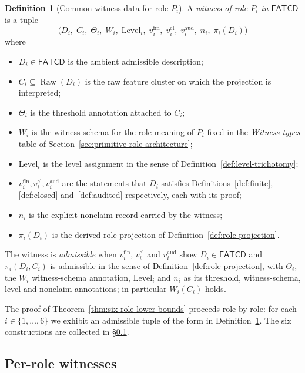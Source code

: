 \documentclass[11pt]{article}
\theoremstyle{definition}
\newtheorem{definition}[theorem]{Definition}
\newcommand{\FATCD}{\ensuremath{\mathsf{FATCD}}}
\newcommand{\Raw}[1]{\ensuremath{\operatorname{Raw}\!\left(#1\right)}}
\begin{document}
\begin{definition}[Common witness data for role \(P_i\)]\label{def:common-witness-data}
A \emph{witness of role \(P_i\) in \FATCD{}} is a tuple
\[
\bigl(D_i,\; C_i,\; \Theta_i,\; W_i,\; \mathrm{Level}_i,\;
v_i^{\mathrm{fin}},\; v_i^{\mathrm{cl}},\; v_i^{\mathrm{aud}},\;
n_i,\; \pi_i(D_i)\bigr)
\]
where
\begin{itemize}[topsep=2pt,itemsep=1pt]
  \item \(D_i \in \FATCD{}\) is the ambient admissible description;
  \item \(C_i \subseteq \Raw{D_i}\) is the raw feature cluster on which
    the projection is interpreted;
  \item \(\Theta_i\) is the threshold annotation attached to \(C_i\);
  \item \(W_i\) is the witness schema for the role meaning of \(P_i\)
    fixed in the \emph{Witness types} table of
    Section~\ref{sec:primitive-role-architecture};
  \item \(\mathrm{Level}_i\) is the level assignment in the sense of
    Definition~\ref{def:level-trichotomy};
  \item \(v_i^{\mathrm{fin}}, v_i^{\mathrm{cl}}, v_i^{\mathrm{aud}}\) are
    the statements that \(D_i\) satisfies Definitions~\ref{def:finite},
    \ref{def:closed} and~\ref{def:audited} respectively, each with its proof;
  \item \(n_i\) is the explicit nonclaim record carried by the witness;
  \item \(\pi_i(D_i)\) is the derived role projection of
    Definition~\ref{def:role-projection}.
\end{itemize}
The witness is \emph{admissible} when \(v_i^{\mathrm{fin}}\),
\(v_i^{\mathrm{cl}}\) and \(v_i^{\mathrm{aud}}\) show \(D_i\in\FATCD{}\) and
\(\pi_i(D_i,C_i)\) is admissible in the sense of
Definition~\ref{def:role-projection}, with \(\Theta_i\), the \(W_i\)
witness-schema annotation, \(\mathrm{Level}_i\) and \(n_i\) as its threshold,
witness-schema, level and nonclaim annotations; in particular \(W_i(C_i)\)
holds.
\end{definition}

The proof of Theorem~\ref{thm:six-role-lower-bounds} proceeds role by
role: for each \(i \in \{1,\ldots,6\}\) we exhibit an admissible
tuple of the form in Definition~\ref{def:common-witness-data}. The
six constructions are collected in
\S\ref{subsec:per-role-witnesses}.

\subsection{Per-role witnesses}\label{subsec:per-role-witnesses}
\end{document}
